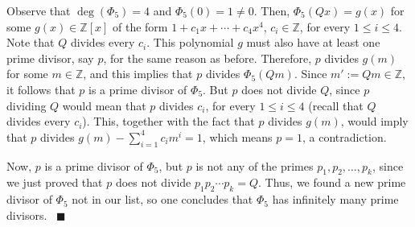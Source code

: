 \documentclass[a4paper, 12pt]{article}
\theoremstyle{definition}
\newcommand{\Z}{\mathbb{Z}}
\DeclareMathOperator{\degpol}{deg} %
\begin{document}
Observe that $\degpol(\Phi_{5})=4$ and $\Phi_{5}(0)=1\neq 0$. Then, $\Phi_{5}(Qx)=g(x)$ for some $g(x)\in\Z[x]$ of the form $1+c_1x+\cdots+c_{4}x^{4}$, $c_i\in\Z$, for every $1\leqslant i \leqslant 4$. Note that $Q$ divides every $c_i$. This polynomial $g$ must also have at least one prime divisor, say $p$, for the same reason as before. Therefore, $p$ divides $g(m)$ for some $m\in\Z$, and this implies that $p$ divides $\Phi_{5}(Qm)$. Since $m':=Qm\in\Z$, it follows that $p$ is a prime divisor of $\Phi_{5}$. But $p$ does not divide $Q$, since $p$ dividing $Q$ would mean that $p$ divides $c_i$, for every $1\leqslant i \leqslant 4$ (recall that $Q$ divides every $c_i$). This, together with the fact that $p$ divides $g(m)$, would imply that $p$ divides $g(m) - \sum_{i=1}^{4}c_im^i=1$, which means $p=1$, a contradiction. 

Now, $p$ is a prime divisor of $\Phi_{5}$, but $p$ is not any of the primes $p_1,p_2,\dots,p_k$, since we just proved that $p$ does not divide $p_1p_2\cdots p_k=Q$. Thus, we found a new prime divisor of $\Phi_{5}$ not in our list, so one concludes that $\Phi_{5}$ has infinitely many prime divisors. \ $\blacksquare$
\end{document}
